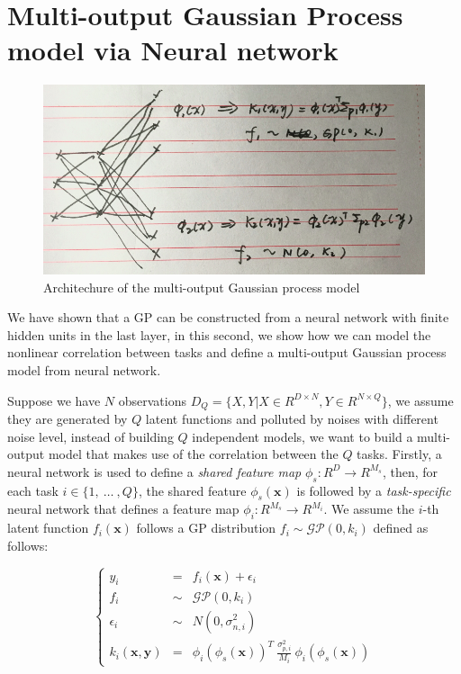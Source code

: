 \section{Multi-output Gaussian Process model via Neural network}

\begin{figure}[!htb]
    \centering
    \includegraphics[width=\columnwidth]{./img/NN-MOGP.png}
    \caption{Architechure of the multi-output Gaussian process model}
    \label{fig:MONNGP}
\end{figure}

We have shown that a GP can be constructed from a neural network with finite hidden units in the last layer, in this second, we show how we can model the nonlinear correlation between tasks and define a multi-output Gaussian process model from neural network. 

Suppose we have $N$ observations $D_Q = \{X, Y | X \in R^{D \times N}, Y \in R^{N \times Q}\}$, we assume they are generated by $Q$ latent functions and polluted by noises with different noise level, instead of building $Q$ independent models, we want to build a multi-output model that makes use of the correlation between the $Q$ tasks. Firstly, a neural network is used to define a \emph{shared feature map} $\phi_s : R^D \rightarrow R^{M_s}$, then, for each task $i \in \{1,~\dots~,Q\}$, the shared feature $\phi_s(\bm{x})$ is followed by a \emph{task-specific} neural network that defines a feature map $\phi_i : R^{M_s} \rightarrow R^{M_i}$. We assume the $i$-th latent function $f_i(\bm{x})$ follows a GP distribution $f_i \sim \mathcal{GP}(0, k_i)$ defined as follows:

\begin{equation}
    \label{eq:mo_kernel}
    \left\{
    \begin{array}{lll}
        y_i                 &=&    f_i(\bm{x}) + \epsilon_i  \\
        f_i                 &\sim& \mathcal{GP}(0, k_i)      \\
        \epsilon_i          &\sim& N(0, \sigma_{n, i}^2)     \\
        k_i(\bm{x}, \bm{y}) &=&    \phi_i(\phi_s(\bm{x}))^T~\frac{\sigma_{p, i}^2}{M_i}~\phi_i(\phi_s(\bm{x}))
    \end{array}
    \right.
\end{equation}

